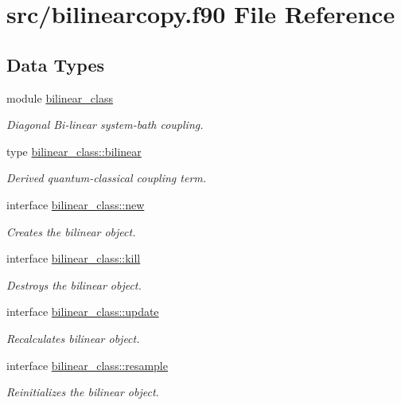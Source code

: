 \hypertarget{bilinearcopy_8f90}{\section{src/bilinearcopy.f90 File Reference}
\label{bilinearcopy_8f90}
}
\subsection*{Data Types}
\begin{DoxyCompactItemize}
\item 
module \hyperlink{classbilinear__class}{bilinear\+\_\+class}
\begin{DoxyCompactList}\small\item\em Diagonal Bi-\/linear system-\/bath coupling. \end{DoxyCompactList}\item 
type \hyperlink{structbilinear__class_1_1bilinear}{bilinear\+\_\+class\+::bilinear}
\begin{DoxyCompactList}\small\item\em Derived quantum-\/classical coupling term. \end{DoxyCompactList}\item 
interface \hyperlink{interfacebilinear__class_1_1new}{bilinear\+\_\+class\+::new}
\begin{DoxyCompactList}\small\item\em Creates the bilinear object. \end{DoxyCompactList}\item 
interface \hyperlink{interfacebilinear__class_1_1kill}{bilinear\+\_\+class\+::kill}
\begin{DoxyCompactList}\small\item\em Destroys the bilinear object. \end{DoxyCompactList}\item 
interface \hyperlink{interfacebilinear__class_1_1update}{bilinear\+\_\+class\+::update}
\begin{DoxyCompactList}\small\item\em Recalculates bilinear object. \end{DoxyCompactList}\item 
interface \hyperlink{interfacebilinear__class_1_1resample}{bilinear\+\_\+class\+::resample}
\begin{DoxyCompactList}\small\item\em Reinitializes the bilinear object. \end{DoxyCompactList}\item 

\end{DoxyCompactItemize}
